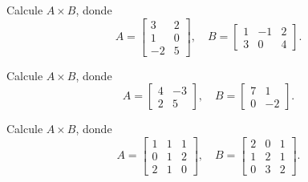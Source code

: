 \begin{ejercicio}
Calcule $A \times B$, donde
\[
A=\begin{bmatrix} 3 & 2 \\ 1 & 0 \\ -2 & 5 \end{bmatrix}, \quad
B=\begin{bmatrix} 1 & -1 & 2 \\ 3 & 0 & 4 \end{bmatrix}.
\]
\end{ejercicio}
\muestraSolucion{
\[
AB=\begin{bmatrix} 9 & -3 & 14 \\ 1 & -1 & 2 \\ 13 & 2 & 16 \end{bmatrix}.
\]
}

\begin{ejercicio}
Calcule $A \times B$, donde
\[
A=\begin{bmatrix} 4 & -3 \\ 2 & 5 \end{bmatrix}, \quad
B=\begin{bmatrix} 7 & 1 \\ 0 & -2 \end{bmatrix}.
\]
\end{ejercicio}
\muestraSolucion{
\[
AB=\begin{bmatrix} 28 & 10 \\ 14 & -8 \end{bmatrix}.
\]
}

\begin{ejercicio}
Calcule $A \times B$, donde
\[
A=\begin{bmatrix} 1 & 1 & 1 \\ 0 & 1 & 2 \\ 2 & 1 & 0 \end{bmatrix}, \quad
B=\begin{bmatrix} 2 & 0 & 1 \\ 1 & 2 & 1 \\ 0 & 3 & 2 \end{bmatrix}.
\]
\end{ejercicio}
\muestraSolucion{
\[
AB=\begin{bmatrix} 3 & 5 & 4 \\ 1 & 8 & 5 \\ 5 & 2 & 3 \end{bmatrix}.
\]
}

